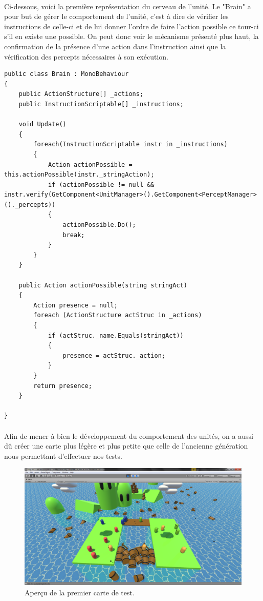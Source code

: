 \documentclass{report}
\begin{document}
\paragraph{}Ci-dessous, voici la première représentation du cerveau de l'unité. Le "Brain" a pour but de gérer le comportement de l'unité, c'est à dire de vérifier les instructions de celle-ci et de lui donner l'ordre de faire l'action possible ce tour-ci s'il en existe une possible. On peut donc voir le mécanisme présenté plus haut, la confirmation de la présence d'une action dans l'instruction ainsi que la vérification des percepts nécessaires à son exécution.
\begin{lstlisting}[language={[Sharp]C},label={lst:firstBrainScript}, caption=  Première version de la classe Brain.cs]
public class Brain : MonoBehaviour
{
    public ActionStructure[] _actions;
    public InstructionScriptable[] _instructions;

    void Update()
    {
        foreach(InstructionScriptable instr in _instructions)
        {
            Action actionPossible = this.actionPossible(instr._stringAction);
            if (actionPossible != null && instr.verify(GetComponent<UnitManager>().GetComponent<PerceptManager>()._percepts))
            {
                actionPossible.Do();
                break;
            }
        }
    }

    public Action actionPossible(string stringAct)
    {
        Action presence = null;
        foreach (ActionStructure actStruc in _actions)
        {
            if (actStruc._name.Equals(stringAct))
            {
                presence = actStruc._action;
            }
        }
        return presence;
    }

}
\end{lstlisting}

\paragraph{}Afin de mener à bien le développement du comportement des unités, on a aussi dû créer une carte plus légère et plus petite que celle de l'ancienne génération nous permettant d'effectuer nos tests.

\begin{figure}[!h]
\centering
\includegraphics[scale=0.3]{FirstMapImage}
\caption{Aperçu de la premier carte de test.}
\end{figure}
\end{document}
